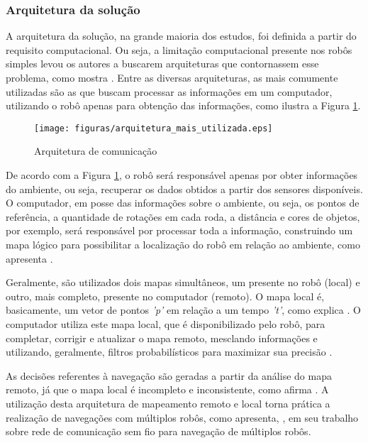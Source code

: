 		\subsubsection{Arquitetura da solução}
		\label{sub:arquitetura_solucao}

			A arquitetura da solução, na grande maioria dos estudos, foi definida a partir do requisito computacional. Ou seja, a limitação computacional presente nos robôs simples levou os autores a buscarem arquiteturas que contornassem esse problema, como mostra \cite{redeComunicacaoIndustria}. Entre as diversas arquiteturas, as mais comumente utilizadas são as que buscam processar as informações em um computador, utilizando o robô apenas para obtenção das informações, como ilustra a Figura \ref{img:arquitetura_mais_utilizada}.

			\begin{figure}[H]
				\centering
				\texttt{[image: figuras/arquitetura\_mais\_utilizada.eps]}
				\caption[Arquitetura de comunicação]{Arquitetura de comunicação}
				\label{img:arquitetura_mais_utilizada}
			\end{figure}

			De acordo com a Figura \ref{img:arquitetura_mais_utilizada}, o robô será responsável apenas por obter informações do ambiente, ou seja, recuperar os dados obtidos a partir dos sensores disponíveis. O computador, em posse das informações sobre o ambiente, ou seja, os pontos de referência, a quantidade de rotações em cada roda, a distância e cores de objetos, por exemplo, será responsável por processar toda a informação, construindo um mapa lógico para possibilitar a localização do robô em relação ao ambiente, como apresenta \cite{redeComunicacaoIndustria}.

			Geralmente, são utilizados dois mapas simultâneos, um presente no robô (local) e outro, mais completo, presente no computador (remoto). O mapa local é, basicamente, um vetor de pontos \textit{'p'} em relação a um tempo \textit{'t'}, como explica \cite{circumventingAssociationSLAM}. O computador utiliza este mapa local, que é disponibilizado pelo robô, para completar, corrigir e atualizar o mapa remoto, mesclando informações e utilizando, geralmente, filtros probabilísticos para maximizar sua precisão \cite{localizacaoEMapeamentoPaulo}.

			As decisões referentes à navegação são geradas a partir da análise do mapa remoto, já que o mapa local é incompleto e inconsistente, como afirma \cite{redeComunicacaoIndustria}. A utilização desta arquitetura de mapeamento remoto e local torna prática a realização de navegações com múltiplos robôs, como apresenta, \cite{redeComunicacaoIndustria}, em seu trabalho sobre rede de comunicação sem fio para navegação de múltiplos robôs. 

